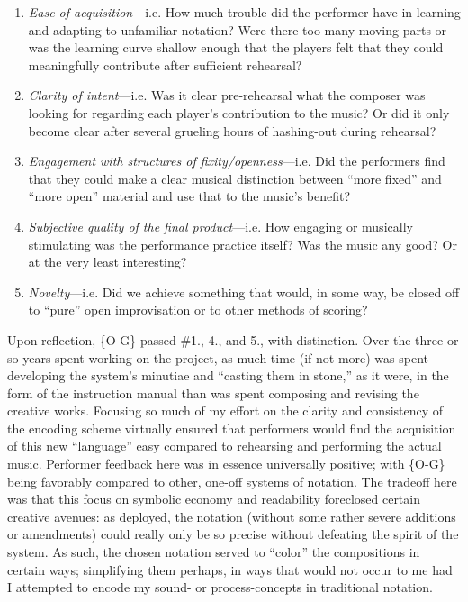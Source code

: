     \begin{enumerate}
    \singlespacing
        \item \textit{Ease of acquisition}---i.e. How much trouble did the performer have in learning and adapting to unfamiliar notation? Were there too many moving parts or was the learning curve shallow enough that the players felt that they could meaningfully contribute after sufficient rehearsal?
        \item \textit{Clarity of intent}---i.e. Was it clear pre-rehearsal what the composer was looking for regarding each player's contribution to the music? Or did it only become clear after several grueling hours of hashing-out during rehearsal?
        \item \textit{Engagement with structures of fixity/openness}---i.e. Did the performers find that they could make a clear musical distinction between ``more fixed'' and ``more open'' material and use that to the music's benefit?
        \item \textit{Subjective quality of the final product}---i.e. How engaging or musically stimulating was the performance practice itself? Was the music any good? Or at the very least interesting?
        \item \textit{Novelty}---i.e. Did we achieve something that would, in some way, be closed off to ``pure'' open improvisation or to other methods of scoring?
    \end{enumerate}

    \noindent Upon reflection, \{O-G\} passed \#1., 4., and 5., with distinction. Over the three or so years spent working on the project, as much time (if not more) was spent developing the system's minutiae and ``casting them in stone,'' as it were, in the form of the instruction manual than was spent composing and revising the creative works. Focusing so much of my effort on the clarity and consistency of the encoding scheme virtually ensured that performers would find the acquisition of this new ``language'' easy compared to rehearsing and performing the actual music. Performer feedback here was in essence universally positive; with \{O-G\} being favorably compared to other, one-off systems of notation. The tradeoff here was that this focus on symbolic economy and readability foreclosed certain creative avenues: as deployed, the notation (without some rather severe additions or amendments) could really only be so precise without defeating the spirit of the system. As such, the chosen notation served to ``color'' the compositions in certain ways; simplifying them perhaps, in ways that would not occur to me had I attempted to encode my sound- or process-concepts in traditional notation. 

